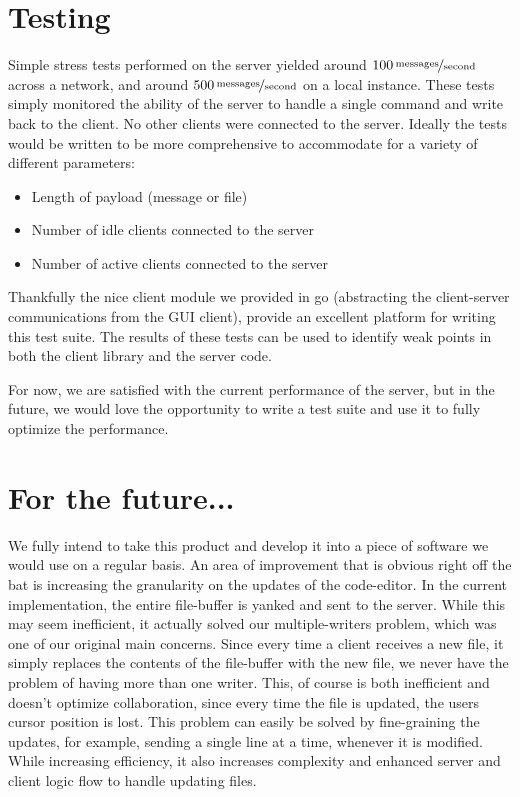 \documentclass[12pt, letterpaper]{article}
\begin{document}
\section*{Testing}

Simple stress tests performed on the server yielded around
$\unitfrac[100]{messages}{second}$ 
across a network, and around
$\unitfrac[500]{messages}{second}$
on a 
local instance. These tests simply monitored the ability of the server 
to handle a single command and write back to the client. No other 
clients were connected to the server. Ideally the tests would be 
written to be more comprehensive to accommodate for a variety of 
different parameters:

\begin{itemize}
	\item Length of payload (message or file)
	\item Number of idle clients connected to the server
	\item Number of active clients connected to the server
\end{itemize}

Thankfully the nice client module we provided in go (abstracting the 
client-server communications from the GUI client), provide an excellent 
platform for writing this test suite. The results of these tests can be 
used to identify weak points in both the client library and the server 
code.

For now, we are satisfied with the current performance of the server, 
but in the future, we would love the opportunity to write a test suite 
and use it to fully optimize the performance.

\section*{For the future...}

We fully intend to take this product and develop it into a piece of 
software we would use on a regular basis. An area of improvement that 
is obvious right off the bat is increasing the granularity on the 
updates of the code-editor. In the current implementation, the entire 
file-buffer is yanked and sent to the server. While this may seem 
inefficient, it actually solved our multiple-writers problem, which was 
one of our original main concerns. Since every time a client receives a 
new file, it simply replaces the contents of the file-buffer with the 
new file, we never have the problem of having more than one writer. 
This, of course is both inefficient and doesn't optimize collaboration, 
since every time the file is updated, the users cursor position is lost. 
This problem can easily be solved by fine-graining the updates, for 
example, sending a single line at a time, whenever it is modified. 
While increasing efficiency, it also increases complexity and enhanced 
server and client logic flow to handle updating files.
\end{document}
